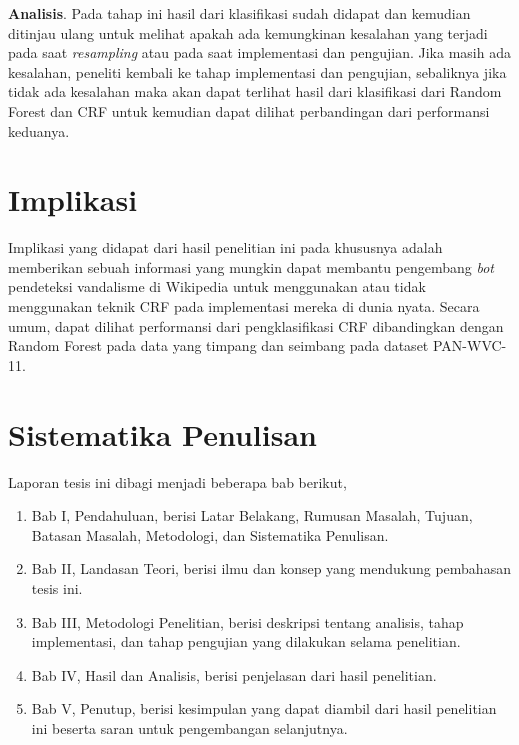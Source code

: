 \textbf{Analisis}.
Pada tahap ini hasil dari klasifikasi sudah didapat dan kemudian ditinjau ulang untuk melihat apakah ada kemungkinan kesalahan yang terjadi pada saat \textit{resampling} atau pada saat implementasi dan pengujian.
Jika masih ada kesalahan, peneliti kembali ke tahap implementasi dan pengujian, sebaliknya jika tidak ada kesalahan maka akan dapat terlihat hasil dari klasifikasi dari Random Forest dan CRF untuk kemudian dapat dilihat perbandingan dari performansi keduanya.


\section{Implikasi}\label{sec:implikasi}

Implikasi yang didapat dari hasil penelitian ini pada khususnya adalah memberikan sebuah informasi yang mungkin dapat membantu pengembang \textit{bot} pendeteksi vandalisme di Wikipedia untuk menggunakan atau tidak menggunakan teknik CRF pada implementasi mereka di dunia nyata.
Secara umum, dapat dilihat performansi dari pengklasifikasi CRF dibandingkan dengan Random Forest pada data yang timpang dan seimbang pada dataset PAN-WVC-11.


\section{Sistematika Penulisan}\label{sec:sistematika-penulisan}

Laporan tesis ini dibagi menjadi beberapa bab berikut,
\begin{enumerate}
	\item Bab I, Pendahuluan, berisi Latar Belakang, Rumusan Masalah, Tujuan, Batasan Masalah, Metodologi, dan Sistematika Penulisan.
	\item Bab II, Landasan Teori, berisi ilmu dan konsep yang mendukung pembahasan tesis ini.
	\item Bab III, Metodologi Penelitian, berisi deskripsi tentang analisis, tahap implementasi, dan tahap pengujian yang dilakukan selama penelitian.
	\item Bab IV, Hasil dan Analisis, berisi penjelasan dari hasil penelitian.
	\item Bab V, Penutup, berisi kesimpulan yang dapat diambil dari hasil penelitian ini beserta saran untuk pengembangan selanjutnya.
\end{enumerate}

